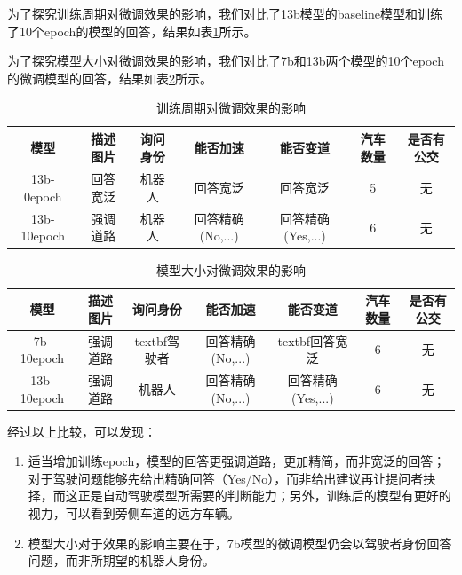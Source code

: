 \documentclass[
    linespread = 1.25
]{ctexart}
\begin{document}
为了探究训练周期对微调效果的影响，我们对比了13b模型的baseline模型和训练了10个epoch的模型的回答，结果如表\ref{effect_epoch}所示。

为了探究模型大小对微调效果的影响，我们对比了7b和13b两个模型的10个epoch的微调模型的回答，结果如表\ref{effect_size}所示。


\begin{table}[hbt]
\small
\centering
\caption{训练周期对微调效果的影响}%
\begin{tabular}{ccccccc}
\toprule
模型 & 描述图片 & 询问身份 & 能否加速 & 能否变道 & 汽车数量 & 是否有公交 \\
\midrule
13b-0epoch & 回答宽泛 & 机器人 & 回答宽泛 & 回答宽泛 & 5 & 无 \\
13b-10epoch & 强调道路 & 机器人 & 回答精确(No,...) & 回答精确(Yes,...) & 6 & 无 \\
\bottomrule
\end{tabular}
\label{effect_epoch}
\end{table}


\begin{table}[ht]
\centering
\caption{模型大小对微调效果的影响}%
\small
\begin{tabular}{ccccccc}
\toprule
模型 & 描述图片 & 询问身份 & 能否加速 & 能否变道 & 汽车数量 & 是否有公交 \\
\midrule
7b-10epoch & 强调道路 & textbf{驾驶者} & 回答精确(No,...) & textbf{回答宽泛} & 6 & 无 \\
13b-10epoch & 强调道路 & 机器人 & 回答精确(No,...) & 回答精确(Yes,...) & 6 & 无 \\
\bottomrule
\end{tabular}
\label{effect_size}
\end{table}


经过以上比较，可以发现：

\begin{enumerate} 
    \item 适当增加训练epoch，模型的回答更强调道路，更加精简，而非宽泛的回答；对于驾驶问题能够先给出精确回答（Yes/No），而非给出建议再让提问者抉择，而这正是自动驾驶模型所需要的判断能力；另外，训练后的模型有更好的视力，可以看到旁侧车道的远方车辆。
    \item 模型大小对于效果的影响主要在于，7b模型的微调模型仍会以驾驶者身份回答问题，而非所期望的机器人身份。
\end{enumerate}
\end{document}
